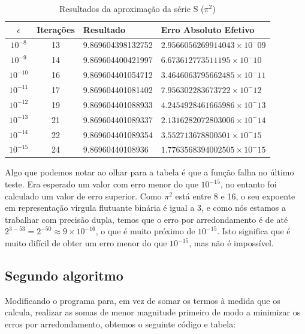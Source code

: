 \documentclass{article}
\begin{document}
\begin{table}[H]
    \centering
    \begin{tabular}{|c|c|l|l|}
        \hline
        \textbf{$\epsilon$} & \textbf{Iterações} & \textbf{Resultado} & \textbf{Erro Absoluto Efetivo} \\ \hline
        $10^{-8}$  & 13 & 9.869604398132752 & $2.9566056269914043 \times 10^-09$ \\ \hline
        $10^{-9}$  & 14 & 9.869604400421997 & $6.673612773511195  \times 10^-10$ \\ \hline
        $10^{-10}$ & 16 & 9.869604401054712 & $3.4646063795662485 \times 10^-11$ \\ \hline
        $10^{-11}$ & 17 & 9.869604401081402 & $7.956302283673722  \times 10^-12$ \\ \hline
        $10^{-12}$ & 19 & 9.869604401088933 & $4.2454928461665986 \times 10^-13$ \\ \hline
        $10^{-13}$ & 21 & 9.869604401089337 & $2.1316282072803006 \times 10^-14$ \\ \hline
        $10^{-14}$ & 22 & 9.869604401089354 & $3.552713678800501  \times 10^-15$ \\ \hline
        $10^{-15}$ & 24 & 9.86960440108936  & $1.7763568394002505 \times 10^-15$ \\ \hline
    \end{tabular}
    \vspace{0.2cm}
    \caption{Resultados da aproximação da série S ($\pi^2$)}
\end{table}

\noindent
Algo que podemos notar ao olhar para a tabela é que a função falha
no último teste. Era esperado um valor com erro menor do que $10^{-15}$,
no entanto foi calculado um valor de erro superior. Como $\pi^2$ está
entre 8 e 16, o seu expoente em representação vírgula flutuante binária
é igual a 3, e como nós estamos a trabalhar com precisão dupla, temos
que o erro por arredondamento é de até
$2^{3-53} = 2^{-50} \approx 9 \times 10^{-16}$, o que é muito próximo
de $10^{-15}$. Isto significa que é muito difícil de obter um erro menor
do que $10^{-15}$, mas não é impossível.
\pagebreak

\subsection{Segundo algoritmo}

Modificando o programa para, em vez de somar os termos à medida que os
calcula, realizar as somas de menor magnitude primeiro de modo a
minimizar os erros por arredondamento, obtemos o seguinte código
e tabela:
\end{document}
